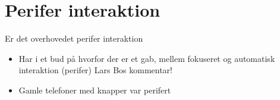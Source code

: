 \section{Perifer interaktion}
\label{DiskussionPeriferInteraktion}
%
Er det overhovedet perifer interaktion
%



\begin{itemize}
  \item Har i et bud på hvorfor der er et gab, mellem fokuseret og automatisk interaktion (perifer) Lars Bos kommentar!
  \item Gamle telefoner med knapper var perifert
\end{itemize}
%